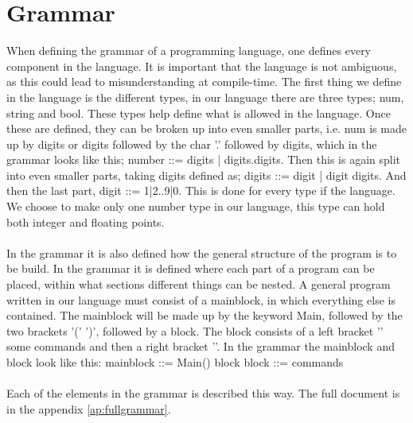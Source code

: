 \section{Grammar}
When defining the grammar of a programming language, one defines every component in the language. It is important that the language is not ambiguous, as this could lead to misunderstanding at compile-time.
The first thing we define in the language is the different types, in our language there are three types; num, string and bool. These types help define what is allowed in the language.
Once these are defined, they can be broken up into even smaller parts, i.e. num is made up by digits or digits followed by the char '.' followed by digits, which in the grammar looks like this; number ::= digits | digits.digits.
Then this is again split into even smaller parts, taking digits defined as; digits ::= digit | digit digits. And then the last part, digit ::= 1|2..9|0. This is done for every type if the language. We choose to make only one number type in our language, this type can hold both integer and floating points.\\
\\
In the grammar it is also defined how the general structure of the program is to be build. In the grammar it is defined where each part of a program can be placed, within what sections different things can be nested. A general program written in our language must consist of a mainblock, in which everything else is contained. The mainblock will be made up by the keyword Main, followed by the two brackets '(' ')', followed by a block.
The block consists of a left bracket '{' some commands and then a right bracket '}'. In the grammar the mainblock and block look like this: mainblock ::= Main() block
block ::= { commands }\\
\\
Each of the elements in the grammar is described this way. The full document is in the appendix \ref{ap:fullgrammar}.